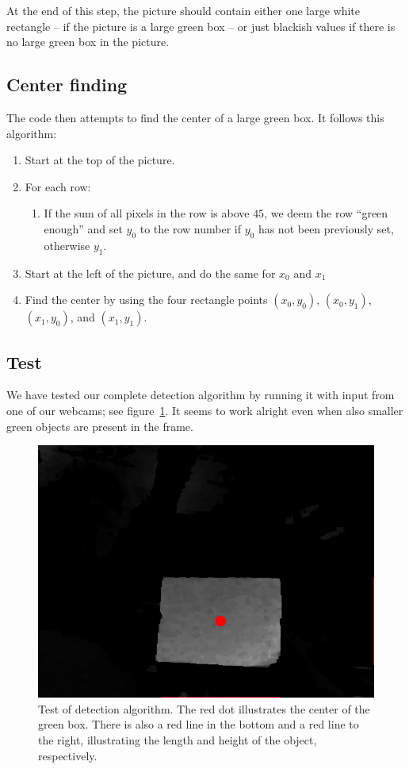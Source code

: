 \documentclass[a4paper,12pt]{article}
\begin{document}
At the end of this step, the picture should contain either one large white
rectangle -- if the picture is a large green box -- or just blackish values if
there is no large green box in the picture.


\subsection{Center finding}

The code then attempts to find the center of a large green box.  It follows this
algorithm:

\begin{enumerate}
\item Start at the top of the picture.
\item For each row:
\begin{enumerate}
\item If the sum of all pixels in the row is above $45$, we deem the row ``green
enough'' and set $y_0$ to the row number if $y_0$ has not been previously set,
otherwise $y_1$.
\end{enumerate}
\item Start at the left of the picture, and do the same for $x_0$ and $x_1$
\item Find the center by using the four rectangle points $(x_0, y_0)$,
$(x_0, y_1)$, $(x_1, y_0)$, and $(x_1, y_1)$.
\end{enumerate}


\subsection{Test}

We have tested our complete detection algorithm by running it with input from
one of our webcams; see figure~\ref{fig:detect-test}.  It seems to work alright
even when also smaller green objects are present in the frame.

\begin{figure}[h]
\includegraphics[width=.9\textwidth]{test.png}
\caption{Test of detection algorithm.  The red dot illustrates the center of the
green box.  There is also a red line in the bottom and a red line to the right,
illustrating the length and height of the object, respectively.}
\label{fig:detect-test}
\end{figure}
\end{document}

